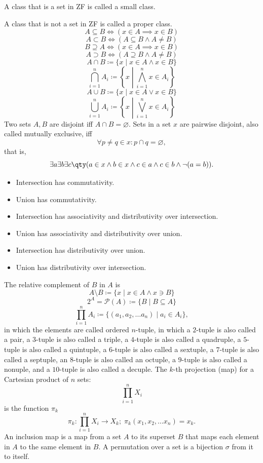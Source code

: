 \documentclass[a4paper,12pt]{article}
\begin{document}
A class that is a set in ZF is called a small class.

A class that is not a set in ZF is called a proper class.
\[A\subseteq B\iff (x\in A\implies x\in B)\]
\[A\subset B\iff (A\subseteq B\land A\neq B)\]
\[B\supseteq A\iff (x\in A\implies x\in B)\]
\[A\supset B\iff (A\supseteq B\land A\neq B)\]
\[A\cap B\coloneq\{x\mid x\in A \land x\in B\}\]
\[\bigcap_{i=1}^n A_i\coloneq\left\{x\middle | \bigwedge_{i=1}^n x\in A_i\right\}\]
\[A\cup B\coloneq\{x\mid x\in A \lor x\in B\}\]
\[\bigcup_{i=1}^n A_i\coloneq\left\{x\middle | \bigvee_{i=1}^n x\in A_i\right\}\]
Two sets $A,B$ are disjoint iff $A\cap B=\varnothing$.
Sets in a set $x$ are pairwise disjoint, also called mutually exclusive, iff
\[\forall p\neq q\in x\colon p\cap q=\varnothing,\]
that is,
\[\exists a\exists b\exists c\qty(a\in x\land b\in x\land c\in a\land c\in b\land\neg(a=b)).\]
\begin{itemize}
\item Intersection has commutativity.
\item Union has commutativity.
\item Intersection has associativity and distributivity over intersection.
\item Union has associativity and distributivity over union.
\item Intersection has distributivity over union.
\item Union has distributivity over intersection.
\end{itemize}
The relative complement of $B$ in $A$ is
\[A\setminus B\coloneq\{x\mid x\in A \land x\ni B\}\]
\[2^A=\mathcal{P}(A)\coloneq\{B\mid B\subseteq A\}\]
\[\prod_{i=1}^nA_i\coloneq\{(a_1,a_2,\ldots a_n)\mid a_i\in A_i\},\]
in which the elements are called ordered $n$-tuple, in which a $2$-tuple is also called a pair, a $3$-tuple is also called a triple, a $4$-tuple is also called a quadruple, a $5$-tuple is also called a quintuple, a $6$-tuple is also called a sextuple, a $7$-tuple is also called a septuple, an $8$-tuple is also called an octuple, a $9$-tuple is also called a nonuple, and a $10$-tuple is also called a decuple.
The $k$-th projection (map) for a Cartesian product of $n$ sets:
\[\prod_{i=1}^nX_i\]
is the function $\pi_k$
\[\pi_k\colon\prod_{i=1}^nX_i\to X_k;\;\pi_k(x_1,x_2,\ldots x_n)=x_k.\]
An inclusion map is a map from a set $A$ to its superset $B$ that maps each element in $A$ to the same element in $B$.
A permutation over a set is a bijection $\sigma$ from it to itself.
\end{document}
